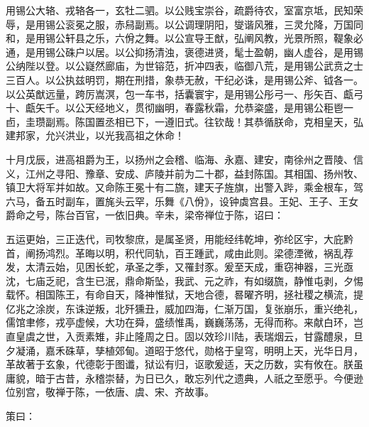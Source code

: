 \documentclass[]{article}
\begin{document}
用锡公大辂、戎辂各一，玄牡二驷。以公贱宝崇谷，疏爵待农，室富京坻，民知荣辱，是用锡公衮冕之服，赤舄副焉。以公调理阴阳，燮谐风雅，三灵允降，万国同和，是用锡公轩县之乐，六佾之舞。以公宣导王猷，弘阐风教，光景所照，鞮象必通，是用锡公硃户以居。以公抑扬清浊，褒德进贤，髦士盈朝，幽人虚谷，是用锡公纳陛以登。以公嶷然廊庙，为世镕范，折冲四表，临御八荒，是用锡公武贲之士三百人。以公执兹明罚，期在刑措，象恭无赦，干纪必诛，是用锡公斧、钺各一。以公英猷远量，跨厉嵩溟，包一车书，括囊寰宇，是用锡公彤弓一、彤矢百、甗弓十、甗矢千。以公天经地义，贯彻幽明，春露秋霜，允恭粢盛，是用锡公秬鬯一卣，圭瓒副焉。陈国置丞相已下，一遵旧式。往钦哉！其恭循朕命，克相皇天，弘建邦家，允兴洪业，以光我高祖之休命！

十月戊辰，进高祖爵为王，以扬州之会稽、临海、永嘉、建安，南徐州之晋陵、信义，江州之寻阳、豫章、安成、庐陵并前为二十郡，益封陈国。其相国、扬州牧、镇卫大将军并如故。又命陈王冕十有二旒，建天子旌旗，出警入跸，乘金根车，驾六马，备五时副车，置旄头云罕，乐舞《八佾》，设钟虡宫县。王妃、王子、王女爵命之号，陈台百官，一依旧典。辛未，梁帝禅位于陈，诏曰：

五运更始，三正迭代，司牧黎庶，是属圣贤，用能经纬乾坤，弥纶区宇，大庇黔首，阐扬鸿烈。革晦以明，积代同轨，百王踵武，咸由此则。梁德湮微，祸乱荐发，太清云始，见困长蛇，承圣之季，又罹封豕。爰至天成，重窃神器，三光亟沈，七庙乏祀，含生已泯，鼎命斯坠，我武、元之祚，有如缀旒，静惟屯剥，夕惕载怀。相国陈王，有命自天，降神惟狱，天地合德，晷曜齐明，拯社稷之横流，提亿兆之涂炭，东诛逆叛，北歼獯丑，威加四海，仁渐万国，复张崩乐，重兴绝礼，儒馆聿修，戎亭虚候，大功在舜，盛绩惟禹，巍巍荡荡，无得而称。来献白环，岂直皇虞之世，入贡素雉，非止隆周之日。固以效珍川陆，表瑞烟云，甘露醴泉，旦夕凝涌，嘉禾硃草，孳植郊甸。道昭于悠代，勋格于皇穹，明明上天，光华日月，革故著于玄象，代德彰于图谶，狱讼有归，讴歌爰适，天之历数，实有攸在。朕虽庸貌，暗于古昔，永稽崇替，为日已久，敢忘列代之遗典，人祇之至愿乎。今便逊位别宫，敬禅于陈，一依唐、虞、宋、齐故事。

策曰：
\end{document}
